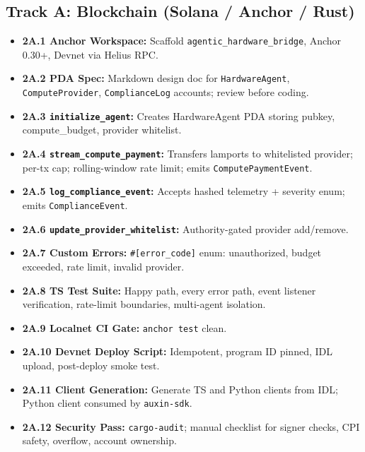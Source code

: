 \documentclass[11pt, a4paper]{article}
\begin{document}
\subsection*{Track A: Blockchain (Solana / Anchor / Rust)}
\begin{itemize}
    \item \textbf{2A.1 Anchor Workspace:} Scaffold \texttt{agentic\_hardware\_bridge}, Anchor 0.30+, Devnet via Helius RPC.
    \item \textbf{2A.2 PDA Spec:} Markdown design doc for \texttt{HardwareAgent}, \texttt{ComputeProvider}, \texttt{ComplianceLog} accounts; review before coding.
    \item \textbf{2A.3 \texttt{initialize\_agent}:} Creates HardwareAgent PDA storing pubkey, compute\_budget, provider whitelist.
    \item \textbf{2A.4 \texttt{stream\_compute\_payment}:} Transfers lamports to whitelisted provider; per-tx cap; rolling-window rate limit; emits \texttt{ComputePaymentEvent}.
    \item \textbf{2A.5 \texttt{log\_compliance\_event}:} Accepts hashed telemetry + severity enum; emits \texttt{ComplianceEvent}.
    \item \textbf{2A.6 \texttt{update\_provider\_whitelist}:} Authority-gated provider add/remove.
    \item \textbf{2A.7 Custom Errors:} \texttt{\#[error\_code]} enum: unauthorized, budget exceeded, rate limit, invalid provider.
    \item \textbf{2A.8 TS Test Suite:} Happy path, every error path, event listener verification, rate-limit boundaries, multi-agent isolation.
    \item \textbf{2A.9 Localnet CI Gate:} \texttt{anchor test} clean.
    \item \textbf{2A.10 Devnet Deploy Script:} Idempotent, program ID pinned, IDL upload, post-deploy smoke test.
    \item \textbf{2A.11 Client Generation:} Generate TS and Python clients from IDL; Python client consumed by \texttt{auxin-sdk}.
    \item \textbf{2A.12 Security Pass:} \texttt{cargo-audit}; manual checklist for signer checks, CPI safety, overflow, account ownership.
\end{itemize}
\end{document}
